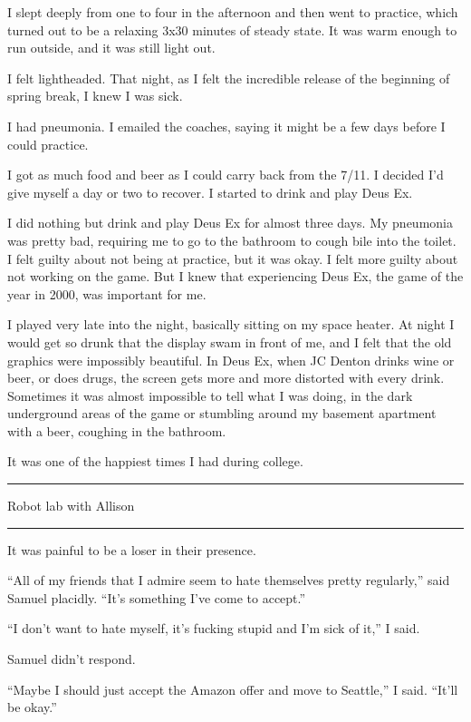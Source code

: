 I slept deeply from one to four in the afternoon and then went to practice,
which turned out to be a relaxing 3x30 minutes of steady state.  It was warm
enough to run outside, and it was still light out.

I felt lightheaded.  That night, as I felt the incredible release of the
beginning of spring break, I knew I was sick.  

I had pneumonia.  I emailed the coaches, saying it might be a few days before I
could practice.

I got as much food and beer as I could carry back from the 7/11.  I decided I'd
give myself a day or two to recover.  I started to drink and play Deus Ex.  

I did nothing but drink and play Deus Ex for almost three days.  My pneumonia
was pretty bad, requiring me to go to the bathroom to cough bile into the
toilet.  I felt guilty about not being at practice, but it was okay.  I felt
more guilty about not working on the game.  But I knew that experiencing Deus
Ex, the game of the year in 2000, was important for me.

I played very late into the night, basically sitting on my space heater.  At
night I would get so drunk that the display swam in front of me, and I felt that
the old graphics were impossibly beautiful.  In Deus Ex, when JC Denton drinks
wine or beer, or does drugs, the screen gets more and more distorted with every
drink.  Sometimes it was almost impossible to tell what I was doing, in the dark
underground areas of the game or stumbling around my basement apartment with a
beer, coughing in the bathroom.

It was one of the happiest times I had during college.

\plainfancybreak{12pt}{2}{* * *}

Robot lab with Allison

\plainfancybreak{12pt}{2}{* * *}

It was painful to be a loser in their presence.  

``All of my friends that I admire seem to hate themselves pretty regularly,''
said Samuel placidly.  ``It's something I've come to accept.''

``I don't want to hate myself, it's fucking stupid and I'm sick of it,'' I said.  

Samuel didn't respond.

``Maybe I should just accept the Amazon offer and move to Seattle,'' I said.
``It'll be okay.''

